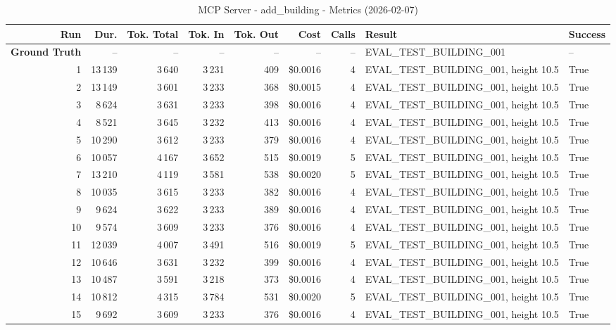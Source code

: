 \documentclass[a4paper,11pt]{article}
\begin{document}
\begin{table}[ht]
\centering
\scriptsize
\caption{MCP Server - add\_building - Metrics (2026-02-07)}
\label{tab:mcp\_add\_building\_metrics\_2026-02-07}
\begin{tabular}{r r r r r r r p{3cm} l}
\hline
Run & Dur. & Tok. Total & Tok. In & Tok. Out & Cost & Calls & Result & Success \\
\hline
\textbf{Ground Truth} & -- & -- & -- & -- & -- & -- & EVAL\_TEST\_BUILDING\_001 & -- \\
1 & 13\,139 & 3\,640 & 3\,231 & 409 & \$0.0016 & 4 & EVAL\_TEST\_BUILDING\_001, height 10.5 & True \\
2 & 13\,149 & 3\,601 & 3\,233 & 368 & \$0.0015 & 4 & EVAL\_TEST\_BUILDING\_001, height 10.5 & True \\
3 & 8\,624 & 3\,631 & 3\,233 & 398 & \$0.0016 & 4 & EVAL\_TEST\_BUILDING\_001, height 10.5 & True \\
4 & 8\,521 & 3\,645 & 3\,232 & 413 & \$0.0016 & 4 & EVAL\_TEST\_BUILDING\_001, height 10.5 & True \\
5 & 10\,290 & 3\,612 & 3\,233 & 379 & \$0.0016 & 4 & EVAL\_TEST\_BUILDING\_001, height 10.5 & True \\
6 & 10\,057 & 4\,167 & 3\,652 & 515 & \$0.0019 & 5 & EVAL\_TEST\_BUILDING\_001, height 10.5 & True \\
7 & 13\,210 & 4\,119 & 3\,581 & 538 & \$0.0020 & 5 & EVAL\_TEST\_BUILDING\_001, height 10.5 & True \\
8 & 10\,035 & 3\,615 & 3\,233 & 382 & \$0.0016 & 4 & EVAL\_TEST\_BUILDING\_001, height 10.5 & True \\
9 & 9\,624 & 3\,622 & 3\,233 & 389 & \$0.0016 & 4 & EVAL\_TEST\_BUILDING\_001, height 10.5 & True \\
10 & 9\,574 & 3\,609 & 3\,233 & 376 & \$0.0016 & 4 & EVAL\_TEST\_BUILDING\_001, height 10.5 & True \\
11 & 12\,039 & 4\,007 & 3\,491 & 516 & \$0.0019 & 5 & EVAL\_TEST\_BUILDING\_001, height 10.5 & True \\
12 & 10\,646 & 3\,631 & 3\,232 & 399 & \$0.0016 & 4 & EVAL\_TEST\_BUILDING\_001, height 10.5 & True \\
13 & 10\,487 & 3\,591 & 3\,218 & 373 & \$0.0016 & 4 & EVAL\_TEST\_BUILDING\_001, height 10.5 & True \\
14 & 10\,812 & 4\,315 & 3\,784 & 531 & \$0.0020 & 5 & EVAL\_TEST\_BUILDING\_001, height 10.5 & True \\
15 & 9\,692 & 3\,609 & 3\,233 & 376 & \$0.0016 & 4 & EVAL\_TEST\_BUILDING\_001, height 10.5 & True \\

\end{tabular}
\end{table}
\end{document}
